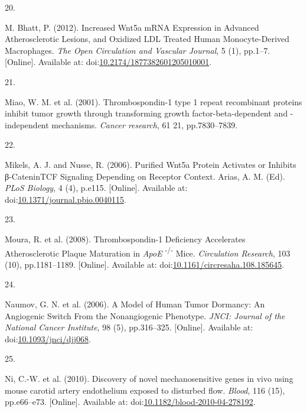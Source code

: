 \documentclass[
  11pt,
]{article}
\newlength{\cslhangindent}
\newlength{\csllabelwidth}
\newlength{\cslentryspacingunit} %
\newenvironment{CSLReferences}[2] %
 {%
  \setlength{\parindent}{0pt}
  \ifodd #1
  \let\oldpar\par
  \def\par{\hangindent=\cslhangindent\oldpar}
  \fi
  \setlength{\parskip}{#2\cslentryspacingunit}
 }%
 {}
\newcommand{\CSLLeftMargin}[1]{\parbox[t]{\csllabelwidth}{#1}}
\newcommand{\CSLRightInline}[1]{\parbox[t]{\linewidth - \csllabelwidth}{#1}\break}
\begin{document}
\begin{CSLReferences}{0}{0}
\leavevmode{}%
\CSLLeftMargin{20. }
\CSLRightInline{M. Bhatt, P. (2012). {Increased Wnt5a mRNA Expression in Advanced Atherosclerotic Lesions, and Oxidized LDL Treated Human Monocyte-Derived Macrophages}. \emph{The Open Circulation and Vascular Journal}, 5 (1), pp.1--7. {[}Online{]}. Available at: doi:\href{https://doi.org/10.2174/1877382601205010001}{10.2174/1877382601205010001}.}

\leavevmode{}%
\CSLLeftMargin{21. }
\CSLRightInline{Miao, W. M. {et al.} (2001). {Thrombospondin-1 type 1 repeat recombinant proteins inhibit tumor growth through transforming growth factor-beta-dependent and -independent mechanisms.} \emph{Cancer research}, 61 21, pp.7830--7839.}

\leavevmode{}%
\CSLLeftMargin{22. }
\CSLRightInline{Mikels, A. J. and Nusse, R. (2006). {Purified Wnt5a Protein Activates or Inhibits β-Catenin{\textendash}TCF Signaling Depending on Receptor Context}. Arias, A. M. (Ed). \emph{PLoS Biology}, 4 (4), p.e115. {[}Online{]}. Available at: doi:\href{https://doi.org/10.1371/journal.pbio.0040115}{10.1371/journal.pbio.0040115}.}

\leavevmode{}%
\CSLLeftMargin{23. }
\CSLRightInline{Moura, R. {et al.} (2008). {Thrombospondin-1 Deficiency Accelerates Atherosclerotic Plaque Maturation in {\emph{ApoE}} {\textsuperscript{{-}/{-}}} Mice}. \emph{Circulation Research}, 103 (10), pp.1181--1189. {[}Online{]}. Available at: doi:\href{https://doi.org/10.1161/circresaha.108.185645}{10.1161/circresaha.108.185645}.}

\leavevmode{}%
\CSLLeftMargin{24. }
\CSLRightInline{Naumov, G. N. {et al.} (2006). {A Model of Human Tumor Dormancy: An Angiogenic Switch From the Nonangiogenic Phenotype}. \emph{JNCI: Journal of the National Cancer Institute}, 98 (5), pp.316--325. {[}Online{]}. Available at: doi:\href{https://doi.org/10.1093/jnci/djj068}{10.1093/jnci/djj068}.}

\leavevmode{}%
\CSLLeftMargin{25. }
\CSLRightInline{Ni, C.-W. {et al.} (2010). {Discovery of novel mechanosensitive genes in vivo using mouse carotid artery endothelium exposed to disturbed flow}. \emph{Blood}, 116 (15), pp.e66--e73. {[}Online{]}. Available at: doi:\href{https://doi.org/10.1182/blood-2010-04-278192}{10.1182/blood-2010-04-278192}.}


\end{CSLReferences}
\end{document}
